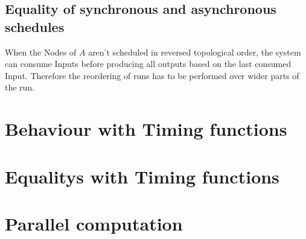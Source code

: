 


\subsection{Equality of synchronous and asynchronous schedules}
\label{sec:concepts:equalitys_without_timing:sync_async}

When the Nodes of \(A\) aren't scheduled in reversed topological order, the system can consume Inputs before producing all outputs based on the last consumed Input.
Therefore the reordering of runs has to be performed over wider parts of the run.

\section{Behaviour with Timing functions}
\section{Equalitys with Timing functions}
\section{Parallel computation}
